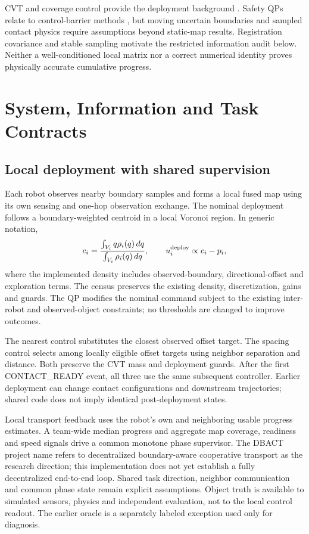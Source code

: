 \documentclass[letterpaper,10pt,conference]{ieeeconf}
\begin{document}
CVT and coverage control provide the deployment background \cite{du1999,cortes2004}. Safety QPs relate to control-barrier methods \cite{ames2017,wang2017safety}, but moving uncertain boundaries and sampled contact physics require assumptions beyond static-map results. Registration covariance and stable sampling \cite{censi2007,bonnabel2016,gelfand2003} motivate the restricted information audit below. Neither a well-conditioned local matrix nor a correct numerical identity proves physically accurate cumulative progress.

\section{System, Information and Task Contracts}
\subsection{Local deployment with shared supervision}
Each robot observes nearby boundary samples and forms a local fused map using its own sensing and one-hop observation exchange. The nominal deployment follows a boundary-weighted centroid in a local Voronoi region. In generic notation,
\begin{equation}
c_i=\frac{\int_{V_i}q\rho_i(q)\,dq}{\int_{V_i}\rho_i(q)\,dq},
\qquad u_i^{\rm deploy}\propto c_i-p_i ,
\end{equation}
where the implemented density includes observed-boundary, directional-offset and exploration terms. The census preserves the existing density, discretization, gains and guards. The QP modifies the nominal command subject to the existing inter-robot and observed-object constraints; no thresholds are changed to improve outcomes.

The nearest control substitutes the closest observed offset target. The spacing control selects among locally eligible offset targets using neighbor separation and distance. Both preserve the CVT mass and deployment guards. After the first CONTACT\_READY event, all three use the same subsequent controller. Earlier deployment can change contact configurations and downstream trajectories; shared code does not imply identical post-deployment states.

Local transport feedback uses the robot's own and neighboring usable progress estimates. A team-wide median progress and aggregate map coverage, readiness and speed signals drive a common monotone phase supervisor. The DBACT project name refers to decentralized boundary-aware cooperative transport as the research direction; this implementation does not yet establish a fully decentralized end-to-end loop. Shared task direction, neighbor communication and common phase state remain explicit assumptions. Object truth is available to simulated sensors, physics and independent evaluation, not to the local control readout. The earlier oracle is a separately labeled exception used only for diagnosis.
\end{document}
